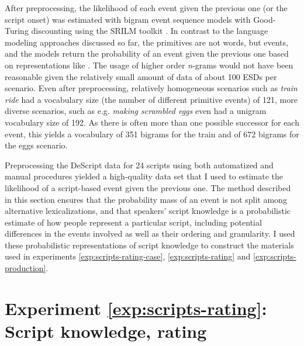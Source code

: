 After preprocessing, the likelihood of each event given the previous one (or the script onset) was estimated with bigram event sequence models with Good-Turing discounting using the SRILM toolkit \citep{stolcke2002}.  In contrast to the language modeling approaches discussed so far, the primitives are not words, but events, and the models return the probability of an event given the previous one based on representations like \Last. The usage of higher order \textit{n}-grams would not have been reasonable given the relatively small amount of data of about 100 ESDs per scenario. Even after preprocessing, relatively homogeneous scenarios such as \textit{train ride} had a vocabulary size (the number of different primitive events) of 121, more diverse scenarios, such as e.g. \textit{making scrambled eggs} even had a unigram vocabulary size of 192. As there is often more than one possible successor for each event, this yields a vocabulary of 351 bigrams for the train and of 672 bigrams for the eggs scenario.

Preprocessing the DeScript data for 24 scripts using both automatized and manual procedures yielded a high-quality data set that I used to estimate the likelihood of a script-based event given the previous one. The method described in this section ensures that the probability mass of an event is not split among alternative lexicalizations, and that speakers' script knowledge is a probabilistic estimate of how people represent a particular script, including potential differences in the events involved as well as their ordering and granularity. I used these probabilistic representations of script knowledge to construct the materials used in experiments \ref{exp:scripts-rating-case}, \ref{exp:scripts-rating} and \ref{exp:scripts-production}.

\label{exp:scripts-rating}
\section{Experiment \ref{exp:scripts-rating}: Script knowledge, rating}  \label{sec:scripts-rating}

